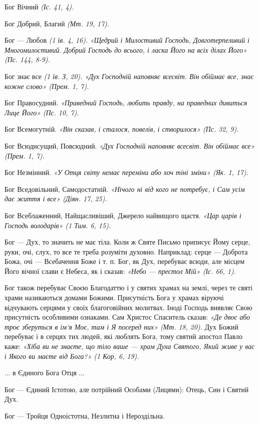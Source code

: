 \documentclass[main.tex]{subfiles}
\begin{document}
Бог Вічний \emph{(Іс. 41, 4).}

Бог Добрий, Благий \emph{(Мт. 19, 17).}

Бог — Любов \emph{(1 їв. 4, 16).} \emph{«Щедрий і Милостивий Господь, Довготерпеливий і Многомилостивий. Добрий Господь до всього, і ласка Його на всіх ділах Його» (Пс. 144, 8-9).}

Бог знає все \emph{(1 їв. З, 20).} \emph{«Дух Господній наповняє всесвіт. Він обіймає все, знає кожне слово» (Прем. 1, 7).}

Бог Правосудний. \emph{«Праведний Господь, любить правду, на праведних дивиться Лице Його» (Пс. 10, 7).}

Бог Всемогутній. \emph{«Він сказав, і сталося, повелів, і створилося» (Пс. 32, 9).}

Бог Всюдисущий, Повсюдний. \emph{«Дух Господній наповняє всесвіт. Він обіймає все» (Прем. 1, 7).}

Бог Незмінний. \emph{«У Отця світу немає переміни або хоч тіні зміни» (Як. 1, 17).}

Бог Вседовільний, Самодостатній. \emph{«Нічого ні від кого не потребує, і Сам усім дає життя і все» (Діян. 17, 25).}

Бог Всеблаженний, Найщасливіший, Джерело найвищого щастя. \emph{«Цар царів і Господь володарів» (1 Тим. 6, 15).}

Бог — Дух, то значить не має тіла. Коли ж Святе Письмо приписує Йому серце, руки, очі, слух, то все те треба розуміти духовно. Наприклад: серце — Доброта Божа, очі — Всебачення Боже і т. п. Бог, як Дух, перебуває всюди, але місцем Його вічної слави є Небеса, як і сказав: \emph{{\color{red}«Небо — престол Мій»} (Іс. 66, 1)}.
 
Бог також перебуває Своєю Благодаттю і у святих храмах на землі, через те святі храми називаються домами Божими. Присутність Бога у храмах віруючі відчувають серцями у своїх благоговійних молитвах. Іноді Господь виявляє Свою присутність особливими ознаками. Сам Христос Спаситель сказав: \emph{{\color{red} «Де двоє або троє зберуться в ім`я Моє, там і Я посеред них»} (Мт. 18, 20).}
Дух Божий перебуває і в серцях тих людей, які люблять Бога, тому святий апостол Павло каже: \emph{«Хіба ви не знаєте, що тіло ваше — храм Духа Святого, Який живе у вас і Якого ви маєте від Бога?» (1 Кор, 6, 19).}

... в Єдиного Бога Отця ...

Бог — Єдиний Істотою, але потрійний Особами (Лицями): Отець, Син і Святий Дух.

Бог — Тройця Одноістотна, Незлитна і Нероздільна.
\end{document}
